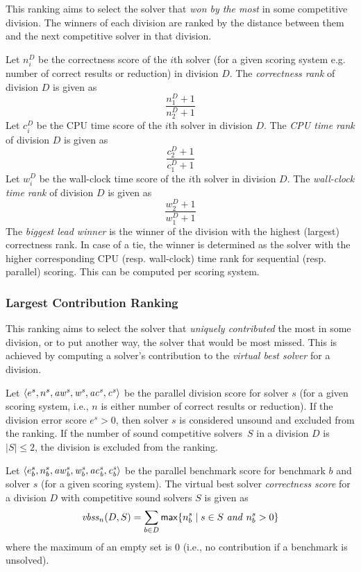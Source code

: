 \documentclass[12pt]{article}
\begin{document}
This ranking aims to select the solver that \emph{won by the most} in some competitive division. The winners of each division are ranked by the distance between them and the next competitive solver in that division.

Let $n_i^D$ be the correctness score of the $i$th solver (for a given scoring
system e.g. number of correct results or reduction) in division $D$.
The \emph{correctness rank} of division $D$ is given as
\[
\frac{n_1^D+1}{n_2^D+1}
\]
Let $c_i^D$ be the CPU time score of the $i$th solver in division $D$.
The \emph{CPU time rank} of division $D$ is given as
\vspace{-1ex}
\[
\frac{c_2^D+1}{c_1^D+1}
\]
Let $w_i^D$ be the wall-clock time score of the $i$th solver in division $D$.
The \emph{wall-clock time rank} of division $D$ is given as
\vspace{-1ex}
\[
\frac{w_2^D+1}{w_1^D+1}
\]
The \emph{biggest lead winner} is the winner of the division with the highest
(largest) correctness rank. In case of a tie, the winner is determined as the
solver with the higher corresponding CPU (resp. wall-clock) time rank for
sequential (resp. parallel) scoring.
This can be computed per scoring system.

\subsubsection{Largest Contribution Ranking}

This ranking aims to select the solver that \emph{uniquely contributed} the most in some division, or to put another way, the solver that would be most missed. This is achieved by computing a solver's contribution to the \emph{virtual best solver} for a division.

Let $\langle e^s, n^s, \it{aw}^s, w^s, \it{ac}^s, c^s \rangle$ be the parallel division score
for solver $s$ (for a given scoring system, i.e., $n$ is either number of correct
results or reduction).
If the division error score $e^s > 0$, then solver $s$ is considered unsound
and excluded from the ranking.
If the number of sound competitive solvers~$S$ in a division $D$ is $|S| \leq 2$,
the division is excluded from the ranking.

Let $\langle e_b^s, n_b^s, \it{aw}_b^s, w_b^s, \it{ac}_b^s, c_b^s \rangle$ be the parallel benchmark
score for benchmark $b$ and solver $s$ (for a given scoring system).
The virtual best solver \emph{correctness score} for a division $D$ with
competitive sound solvers $S$ is given as
\[
\mathit{vbss}_n(D,S) = \sum_{b \in D} {\sf max}\{ n_b^s \mid s \in S ~\mathit{and}~ n_b^s > 0 \}
\]
where the maximum of an empty set is 0 (i.e., no contribution if a benchmark
is unsolved).
\end{document}
